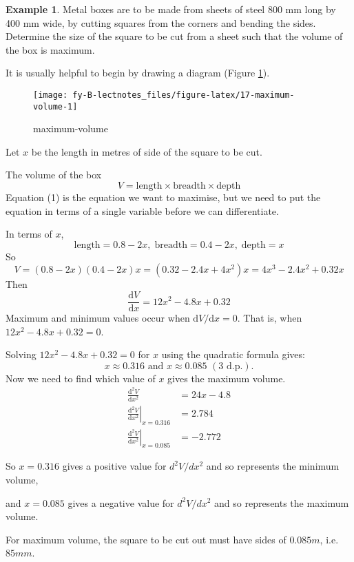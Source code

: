 \documentclass[
  english,
  11pt,
  oneside]{book}
\newcommand{\slide}{}
\theoremstyle{definition}
\theoremstyle{definition}
\newtheorem{example}{Example}[chapter]
\theoremstyle{definition}
\theoremstyle{definition}
\theoremstyle{remark}
\begin{document}
\slide

\begin{example}
Metal boxes are to be made from sheets of steel 800 mm long by 400 mm wide, by cutting squares from the corners and bending the sides. Determine the size of the square to be cut from a sheet such that the volume of the box is maximum.
\end{example}

It is usually helpful to begin by drawing a diagram (Figure \ref{fig:17-maximum-volume}).

\begin{figure}

{\centering \texttt{[image: fy-B-lectnotes\_files/figure-latex/17-maximum-volume-1]} 

}

\caption{maximum-volume}\label{fig:17-maximum-volume}
\end{figure}

Let \(x\) be the length in metres of side of the square to be cut.

The volume of the box
\[
V = \text{length}\times\text{breadth}\times\text{depth}\tag{1}
\]
Equation (1) is the equation we want to maximise, but we need to put the equation in terms of a single variable before we can differentiate.

\begin{notslides}

In terms of \(x\),
\[
\text{length} = 0.8 - 2x,\; \text{breadth} = 0.4 - 2x,\;\text{depth} = x
\]
So
\[
V = (0.8 - 2x)(0.4 - 2x)x = (0.32 - 2.4x + 4x^2)x = 4x^3 - 2.4x^2 + 0.32x
\]
Then
\[
\frac{\mathrm{d}V}{\mathrm{d} x} = 12x^2 - 4.8x + 0.32
\]
Maximum and minimum values occur when \(\mathrm{d}V/\mathrm{d}x  = 0\).
That is, when \(12x^2 - 4.8x + 0.32= 0\).

Solving \(12x^2 - 4.8x + 0.32= 0\) for \(x\) using the quadratic formula gives:
\[
 x \approx 0.316\text{ and }x \approx 0.085\,\,(3\text{ d.p.}).
\]
Now we need to find which value of \(x\) gives the maximum volume.
\begin{align*}
\frac{\mathrm{d}^2 V}{\mathrm{d} x^2} &= 24x - 4.8\\
\left.\frac{\mathrm{d}^2 V}{\mathrm{d} x^2}\right\vert_{x=0.316} &= 2.784\\
\left.\frac{\mathrm{d}^2 V}{\mathrm{d} x^2}\right\vert_{x=0.085} &= -2.772
\end{align*}

So \(x=0.316\) gives a positive value for \(d^2V/dx^2\) and so represents the minimum volume,

and \(x=0.085\) gives a negative value for \(d^2V/dx^2\) and so represents the maximum volume.

For maximum volume, the square to be cut out must have sides of \(0.085 m\), i.e.~\(85 mm\).

\end{notslides}
\end{document}
